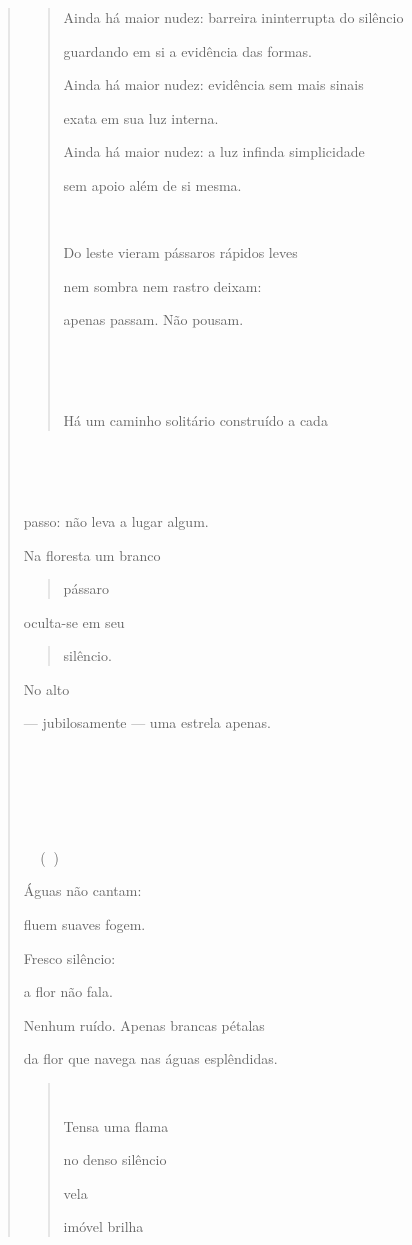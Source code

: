 \begin{verse}
\begin{quote}
Ainda há maior nudez: barreira ininterrupta do silêncio

guardando em si a evidência das formas.

Ainda há maior nudez: evidência sem mais sinais

exata em sua luz interna.

Ainda há maior nudez: a luz infinda simplicidade

sem apoio além de si mesma.



Do leste vieram pássaros rápidos leves

nem sombra nem rastro deixam:

apenas passam. Não pousam.





Há um caminho solitário construído a cada
\end{quote}





passo: não leva a lugar algum.

Na floresta um branco

\begin{quote}
pássaro
\end{quote}

oculta-se em seu

\begin{quote}
silêncio.
\end{quote}

No alto

--- jubilosamente --- uma estrela apenas.







 ()

Águas não cantam:

fluem suaves fogem.

Fresco silêncio:

a flor não fala.

Nenhum ruído. Apenas brancas pétalas

da flor que navega nas águas esplêndidas.

\begin{quote}


Tensa uma flama

no denso silêncio

vela

imóvel brilha


\end{quote}
\end{verse}
